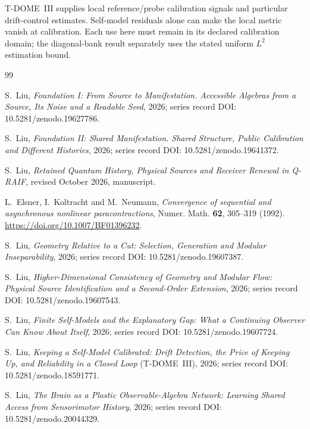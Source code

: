 \documentclass[12pt]{article}
\theoremstyle{definition}
\theoremstyle{remark}
\begin{document}
T-DOME~III supplies local reference/probe calibration signals and
particular drift-control estimates. Self-model residuals alone can
make the local metric vanish at calibration. Each use here must remain
in its declared calibration domain; the diagonal-bank result separately
uses the stated uniform $L^2$ estimation bound.

\newpage
{}

\begin{thebibliography}{99}
\small
\sloppy

S.~Liu, \emph{Foundation I: From Source to Manifestation.
Accessible Algebras from a Source, Its Noise and a Readable Seed},
2026; series record DOI: 10.5281/zenodo.19627786.

S.~Liu, \emph{Foundation II: Shared Manifestation.
Shared Structure, Public Calibration and Different Histories},
2026; series record DOI: 10.5281/zenodo.19641372.

S.~Liu, \emph{Retained Quantum History, Physical Sources and Receiver Renewal in Q-RAIF},
revised October 2026, manuscript.

L.~Elsner, I.~Koltracht and M.~Neumann,
\emph{Convergence of sequential and asynchronous nonlinear paracontractions},
Numer. Math. \textbf{62}, 305--319 (1992).
\url{https://doi.org/10.1007/BF01396232}.

S.~Liu, \emph{Geometry Relative to a Cut: Selection, Generation and Modular Inseparability}, 2026;
series record DOI: 10.5281/zenodo.19607387.

S.~Liu, \emph{Higher-Dimensional Consistency of Geometry and Modular Flow: Physical Source Identification and a Second-Order Extension},
2026; series record DOI: 10.5281/zenodo.19607543.

S.~Liu, \emph{Finite Self-Models and the Explanatory Gap:
What a Continuing Observer Can Know About Itself}, 2026; series record DOI: 10.5281/zenodo.19607724.

S.~Liu, \emph{Keeping a Self-Model Calibrated: Drift Detection,
the Price of Keeping Up, and Reliability in a Closed Loop}
(T-DOME~III), 2026;
series record DOI: 10.5281/zenodo.18591771.

S.~Liu, \emph{The Brain as a Plastic Observable-Algebra Network:
Learning Shared Access from Sensorimotor History}, 2026; series record DOI: 10.5281/zenodo.20044329.


\end{thebibliography}
\end{document}
